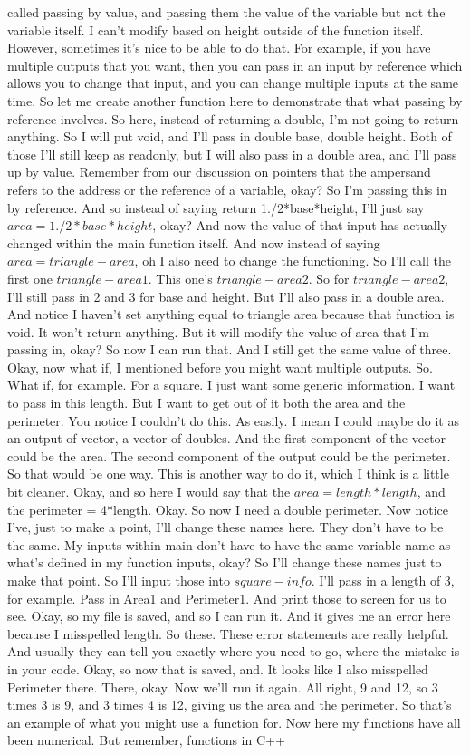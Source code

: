 \documentclass[10pt]{article}
\begin{document}
called passing by value, and passing them the value of the variable but not the variable itself. I can't modify based on height outside of the function itself. However, sometimes it's nice to be able to do that. For example, if you have multiple outputs that you want, then you can pass in an input by reference which allows you to change that input, and you can change multiple inputs at the same time. So let me create another function here to demonstrate that what passing by reference involves. So here, instead of returning a double, I'm not going to return anything. So I will put void, and I'll pass in double base, double height. Both of those I'll still keep as readonly, but I will also pass in a double area, and I'll pass up by value. Remember from our discussion on pointers that the ampersand refers to the address or the reference of a variable, okay? So I'm passing this in by reference. And so instead of saying return 1./2*base*height, I'll just say $area = 1./2*base*height$, okay? And now the value of that input has actually changed within the main function itself. And now instead of saying $area = triangle-area$, oh I also need to change the functioning. So I'll call the first one $triangle-area1$. This one's $triangle-area2$. So for $triangle-area2$, I'll still pass in 2 and 3 for base and height. But I'll also pass in a double area. And notice I haven't set anything equal to triangle area because that function is void. It won't return anything. But it will modify the value of area that I'm passing in, okay? So now I can run that. And I still get the same value of three. Okay, now what if, I mentioned before you might want multiple outputs. So. What if, for example. For a square. I just want some generic information. I want to pass in this length. But I want to get out of it both the area and the perimeter. You notice I couldn't do this. As easily. I mean I could maybe do it as an output of vector, a vector of doubles. And the first component of the vector could be the area. The second component of the output could be the perimeter. So that would be one way. This is another way to do it, which I think is a little bit cleaner. Okay, and so here I would say that the $area = length*length$, and the perimeter = 4*length. Okay. So now I need a double perimeter. Now notice I've, just to make a point, I'll change these names here. They don't have to be the same. My inputs within main don't have to have the same variable name as what's defined in my function inputs, okay? So I'll change these names just to make that point. So I'll input those into $square-info$. I'll pass in a length of 3, for example. Pass in Area1 and Perimeter1. And print those to screen for us to see. Okay, so my file is saved, and so I can run it. And it gives me an error here because I misspelled length. So these. These error statements are really helpful. And usually they can tell you exactly where you need to go, where the mistake is in your code. Okay, so now that is saved, and. It looks like I also misspelled Perimeter there. There, okay. Now we'll run it again. All right, 9 and 12, so 3 times 3 is 9, and 3 times 4 is 12, giving us the area and the perimeter. So that's an example of what you might use a function for. Now here my functions have all been numerical. But remember, functions in C++ 
\end{document}
